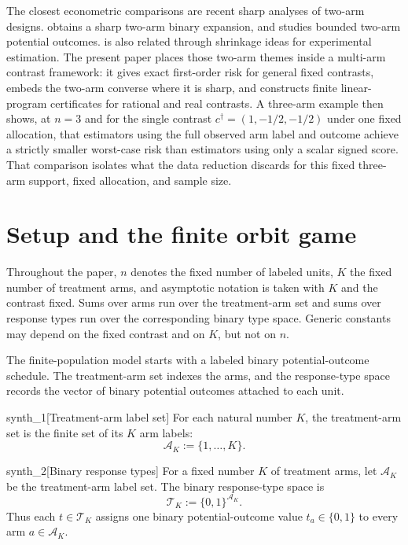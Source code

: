 \documentclass[11pt]{article}
\begin{document}
The closest econometric comparisons are recent sharp analyses of two-arm designs. \citet{sudijono_dobriban_tchetgen_2026_sharp} obtains a sharp two-arm binary expansion, and \citet{hull_2026_bounded} studies bounded two-arm potential outcomes. \citet{rosenman_hunter_2026_shrinkage} is also related through shrinkage ideas for experimental estimation. The present paper places those two-arm themes inside a multi-arm contrast framework: it gives exact first-order risk for general fixed contrasts, embeds the two-arm converse where it is sharp, and constructs finite linear-program certificates for rational and real contrasts. A three-arm example then shows, at \(n=3\) and for the single contrast \(c^\dagger=(1,-1/2,-1/2)\) under one fixed allocation, that estimators using the full observed arm label and outcome achieve a strictly smaller worst-case risk than estimators using only a scalar signed score. That comparison isolates what the data reduction discards for this fixed three-arm support, fixed allocation, and sample size.


\section{Setup and the finite orbit game}\label{sec:setup}

Throughout the paper, \(n\) denotes the fixed number of labeled units, \(K\) the fixed number of treatment arms, and asymptotic notation is taken with \(K\) and the contrast fixed. Sums over arms run over the treatment-arm set and sums over response types run over the corresponding binary type space. Generic constants may depend on the fixed contrast and on \(K\), but not on \(n\).

The finite-population model starts with a labeled binary potential-outcome schedule. The treatment-arm set  indexes the arms, and the response-type space records the vector of binary potential outcomes attached to each unit.

\begin{definitionv}{synth_1}[Treatment-arm label set]
For each natural number \(K\), the treatment-arm set is the finite set of its \(K\) arm labels:
\[
\mathcal A_K:=\{1,\ldots,K\}.
\]
\end{definitionv}

\begin{definitionv}{synth_2}[Binary response types]
For a fixed number \(K\) of treatment arms, let \(\mathcal A_K\) be the treatment-arm label set. The binary response-type space is
\[
\mathcal T_K := \{0,1\}^{\mathcal A_K}.
\]
Thus each \(t\in\mathcal T_K\) assigns one binary potential-outcome value \(t_a\in\{0,1\}\) to every arm \(a\in\mathcal A_K\).
\end{definitionv}
\end{document}
